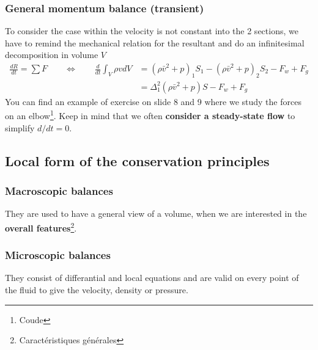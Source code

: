 		\subsubsection{General momentum balance (transient)}
			To consider the case within the velocity is not constant into the 2 sections, we have to remind the mechanical relation for the resultant and do an infinitesimal decomposition in volume $V$	
			\begin{equation}						
			\begin{aligned}
				\frac{dR}{dt} = \sum F \qquad \Leftrightarrow \qquad \frac{d}{dt}\int _V \rho v dV &= (\rho \bar{v}^2 +p)_1S_1 - (\rho \bar{v}^2 +p)_2S_2 - F_w + F_g \\
				&= \Delta ^2 _1 (\rho \bar{v}^2  +p)S-F_w+F_g
			\end{aligned}
			\end{equation}
			You can find an example of exercise on slide 8 and 9 where we study the forces on an elbow\footnote{Coude}. Keep in mind that we often \textbf{consider a steady-state flow} to simplify $d/dt = 0$.
			
		\subsection{Local form of the conservation principles}
			\subsubsection{Macroscopic balances}
				They are used to have a general view of a volume, when we are interested in the \textbf{overall features}\footnote{Caractéristiques générales}.
			\subsubsection{Microscopic balances}
				They consist of differantial and local equations and are valid on every point of the fluid to give the velocity, density or pressure. 

